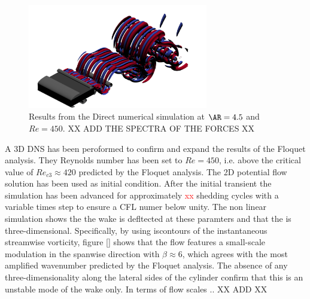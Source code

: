\begin{figure}
  \centering
  \includegraphics[width=0.7\textwidth]{./fig/AR4p5/lambda2_omegax-3D-Re450b.png}
  \caption{Results from the Direct numerical simulation at $\AR=4.5$ and $Re=450$. XX ADD THE SPECTRA OF THE FORCES XX}
  \label{fig:dns-ar4p5}
\end{figure}
%
A 3D DNS has been peroformed to confirm and expand the results of the Floquet analysis. They Reynolds number has been set to $Re=450$, i.e. above the critical value of $Re_{c3} \approx 420$ predicted by the Floquet analysis. The 2D potential flow solution has been used as initial condition. After the initial transient the simulation has been advanced for approximately \textcolor{red}{xx} shedding cycles with a variable times step to ensure a CFL numer below unity. The non linear simulation shows the the wake is defltected at these paramters and that the is three-dimensional. Specifically, by using iscontours of the instantaneous streamwise vorticity, figure \ref{} shows that the flow features a small-scale modulation in the spanwise direction with $\beta \approx 6$, which agrees with the most amplified wavenumber predicted by the Floquet analysis. The absence of any three-dimensionality along the lateral sides of the cylinder confirm that this is an unstable mode of the wake only. In terms of flow scales .. XX ADD XX
